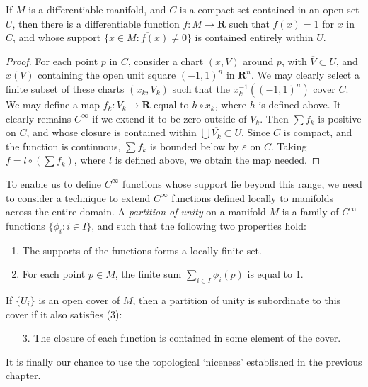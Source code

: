 \begin{theorem}
    If $M$ is a differentiable manifold, and $C$ is a compact set contained in an open set $U$, then there is a differentiable function $f:M \to \mathbf{R}$ such that $f(x) = 1$ for $x$ in $C$, and whose support $\overline{\{ x \in M : f(x) \neq 0 \}}$ is contained entirely within $U$.
\end{theorem}
\begin{proof}
    For each point $p$ in $C$, consider a chart $(x,V)$ around $p$, with $\overline{V} \subset U$, and $x(V)$ containing the open unit square $(-1,1)^n$ in $\mathbf{R}^n$. We may clearly select a finite subset of these charts $(x_k,V_k)$ such that the $x_k^{-1}((-1,1)^n)$ cover $C$. We may define a map $f_k:V_k \to \mathbf{R}$ equal to $h \circ x_k$, where $h$ is defined above. It clearly remains $C^\infty$ if we extend it to be zero outside of $V_k$. Then $\sum f_k$ is positive on $C$, and whose closure is contained within $\bigcup \overline{V_k} \subset U$. Since $C$ is compact, and the function is continuous, $\sum f_k$ is bounded below by $\varepsilon$ on $C$. Taking $f = l \circ (\sum f_k)$, where $l$ is defined above, we obtain the map needed.
\end{proof}

To enable us to define $C^\infty$ functions whose support lie beyond this range, we need to consider a technique to extend $C^\infty$ functions defined locally to manifolds across the entire domain. A \emph{partition of unity} on a manifold $M$ is a family of $C^\infty$ functions $\{ \phi_i : i \in I \}$, and such that the following two properties hold:
%
\begin{enumerate}
    \item The supports of the functions forms a locally finite set.
    \item For each point $p \in M$, the finite sum $\sum_{i \in I} \phi_i(p)$ is equal to 1.
\end{enumerate}
%
If $\{ U_i \}$ is an open cover of $M$, then a partition of unity is subordinate to this cover if it also satisfies (3):
%
\begin{enumerate}
    \item[3.] The closure of each function is contained in some element of the cover.
\end{enumerate}
%
It is finally our chance to use the topological `niceness' established in the previous chapter.

